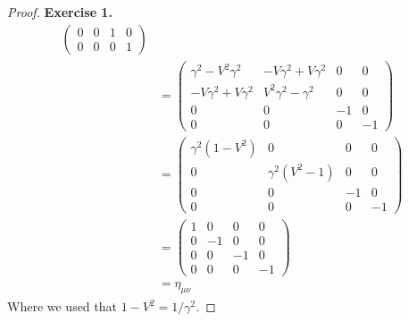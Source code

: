 \documentclass[11pt]{article}
\theoremstyle{definition}
\begin{document}
\begin{proof}{\textbf{Exercise 1.}}
\begin{align*}
\begin{pmatrix}
        0 & 0 & 1 & 0 \\
        0 & 0 & 0 & 1
    \end{pmatrix} \\
    &= \begin{pmatrix}
        \gamma^2 - V^2\gamma^2 & -V\gamma^2 + V\gamma^2 & 0 & 0 \\
        -V\gamma^2 + V\gamma^2 & V^2\gamma^2 - \gamma^2 & 0 & 0 \\
        0 & 0 & -1 & 0 \\
        0 & 0 & 0 & -1
    \end{pmatrix} \\
    &= \begin{pmatrix}
        \gamma^2(1 - V^2) & 0 & 0 & 0 \\
        0 & \gamma^2(V^2 - 1) & 0 & 0 \\
        0 & 0 & -1 & 0 \\
        0 & 0 & 0 & -1
    \end{pmatrix} \\
    &= \begin{pmatrix}
        1 & 0 & 0 & 0 \\
        0 & -1 & 0 & 0 \\
        0 & 0 & -1 & 0 \\
        0 & 0 & 0 & -1
    \end{pmatrix} \\
    &= \eta_{\mu\nu}
\end{align*}
Where we used that $1 - V^2 = 1/\gamma^2$.
\end{proof}
\end{document}
